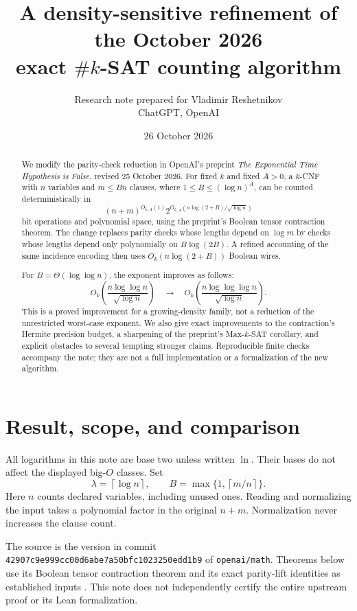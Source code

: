 \documentclass[11pt]{article}
\title{\textbf{A density-sensitive refinement of the October 2026\\ exact \(\#k\)-SAT counting algorithm}}
\author{Research note prepared for Vladimir Reshetnikov\\
\small ChatGPT, OpenAI}
\date{26 October 2026}
\theoremstyle{remark}
\newcommand{\ceil}[1]{\left\lceil #1\right\rceil}
\begin{document}
\maketitle
\begin{abstract}
We modify the parity-check reduction in OpenAI's preprint
\emph{The Exponential Time Hypothesis is False}, revised 25 October
2026. For fixed \(k\) and fixed \(A>0\), a \(k\)-CNF with \(n\)
variables and \(m\le Bn\) clauses, where
\(1\le B\le(\log n)^A\), can be counted deterministically in
\[
 (n+m)^{O_{k,A}(1)}
 2^{O_{k,A}\!\left(n\log(2+B)/\sqrt{\log n}\right)}
\]
bit operations and polynomial space, using the preprint's Boolean tensor
contraction theorem. The change replaces parity checks whose lengths
depend on \(\log m\) by checks whose lengths depend only polynomially on
\(B\log(2B)\). A refined accounting of the same incidence encoding then
uses \(O_k(n\log(2+B))\) Boolean wires.

For \(B=\Theta(\log\log n)\), the exponent improves as follows:
\[
 O_k\!\left(\frac{n\log\log n}{\sqrt{\log n}}\right)
 \quad\longrightarrow\quad
 O_k\!\left(\frac{n\log\log\log n}{\sqrt{\log n}}\right).
\]
This is a proved improvement for a growing-density family, not a reduction
of the unrestricted worst-case exponent. We also give exact improvements
to the contraction's Hermite precision budget, a sharpening of the
preprint's Max-\(k\)-SAT corollary, and explicit obstacles to several
tempting stronger claims. Reproducible finite checks accompany the note;
they are not a full implementation or a formalization of the new algorithm.
\end{abstract}
\begingroup\small\tableofcontents\endgroup
\newpage

\section{Result, scope, and comparison}\label{sec:result}
All logarithms in this note are base two unless written \(\ln\).
Their bases do not affect the displayed big-\(O\) classes. Set
\[
 \lambda=\ceil{\log n},\qquad B=\max\{1,\ceil{m/n}\}.
\]
Here \(n\) counts declared variables, including unused ones. Reading and
normalizing the input takes a polynomial factor in the original \(n+m\).
Normalization never increases the clause count.

The source is the version in commit
\texttt{42907c9e999cc00d6abe7a50bfc1023250edd1b9} of
\texttt{openai/math}. Theorems below use its Boolean tensor contraction
theorem and its exact parity-lift identities as established inputs
\cite{OAI26}. This note does not independently certify the entire
upstream proof or its Lean formalization.
\end{document}
